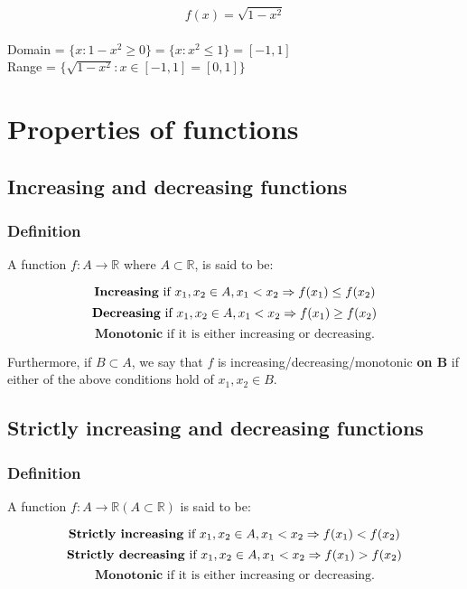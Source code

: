 \documentclass[11pt]{article}
\begin{document}
\[f(x) = \sqrt{1-x^2}\]
\\[0pt]

Domain = \(\{x: 1 - x^2 \ge 0\} = \{ x : x^2 \le 1\} = [-1,1]\)
\\[0pt]

Range = \(\{\sqrt{1 - x^2} : x \in [-1, 1] = [0, 1]\}\)

\newpage

\section{Properties of functions}
\label{sec:org6f24de5}

\subsection{Increasing and decreasing functions}
\label{sec:org4f319d5}

\subsubsection{Definition}
\label{sec:org898c059}
A function \(f : A \rightarrow \mathbb{R}\) where \(A \subset \mathbb{R}\), is said to be:

\[\text{\textbf{Increasing} if } x_1, x_2 \in A, x_1 < x_2 \Rightarrow f(x_1) \le f(x_2)\]
\[\text{\textbf{Decreasing} if } x_1, x_2 \in A, x_1 < x_2 \Rightarrow f(x_1) \ge f(x_2)\]
\[\textbf{Monotonic } \text{if it is either increasing or decreasing.}\]

Furthermore, if \(B \subset A\), we say that \(f\) is increasing/decreasing/monotonic \textbf{on B} if either of the above conditions hold of \(x_1, x_2 \in B\).

\subsection{Strictly increasing and decreasing functions}
\label{sec:orgb67f729}

\subsubsection{Definition}
\label{sec:org0374fed}
A function \(f : A \rightarrow \mathbb{R} (A \subset \mathbb{R})\) is said to be:

\[\text{\textbf{Strictly increasing} if } x_1, x_2 \in A, x_1 < x_2 \Rightarrow f(x_1) < f(x_2)\]
\[\text{\textbf{Strictly decreasing} if } x_1, x_2 \in A, x_1 < x_2 \Rightarrow f(x_1) > f(x_2)\]
\[\textbf{Monotonic } \text{if it is either increasing or decreasing.}\]
\end{document}
